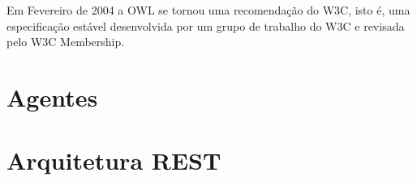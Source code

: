 Em Fevereiro de 2004 a OWL se tornou uma recomendação do W3C, isto é, uma especificação estável desenvolvida por um grupo de trabalho do W3C e revisada pelo W3C Membership.





\section{Agentes} %
\label{sec:agentes}






\section{Arquitetura REST} %
\label{sec:arquitetura_rest}





